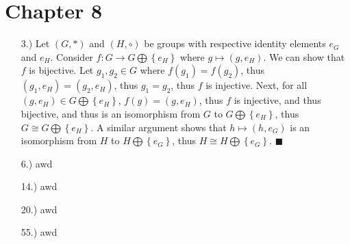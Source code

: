\documentclass[11pt]{article}
\newcommand{\braces}[1]{\left\{#1\right\}}           %
\begin{document}
\pagestyle{fancy}
\fancyhead{}

\normalsize

\section*{Chapter 8}
\begin{itemize}
    \item [3.)] Let $(G,*)$ and $(H,\circ)$ be groups with respective identity elements $e_G$ and $e_H$. Consider $f:G\to G\bigoplus\braces{e_H}$ where $g\mapsto(g,e_H)$. We can show that $f$ is bijective. Let $g_1,g_2\in G$ where $f(g_1)=f(g_2)$, thus $(g_1,e_H)=(g_2,e_H)$, thus $g_1=g_2$, thus $f$ is injective. Next, for all $(g,e_H)\in G\bigoplus\braces{e_H}$, $f(g)=(g,e_H)$, thus $f$ is injective, and thus bijective, and thus is an isomorphism from $G$ to $G\bigoplus\braces{e_H}$, thus $G\cong G\bigoplus\braces{e_H}$. A similar argument shows that $h\mapsto(h,e_G)$ is an isomorphism from $H$ to $H\bigoplus\braces{e_G}$, thus $H\cong H\bigoplus\braces{e_G}$. $\blacksquare$

    \item [6.)] awd

    \item [14.)] awd

    \item [20.)] awd

    \item [55.)] awd
\end{itemize}
\end{document}
